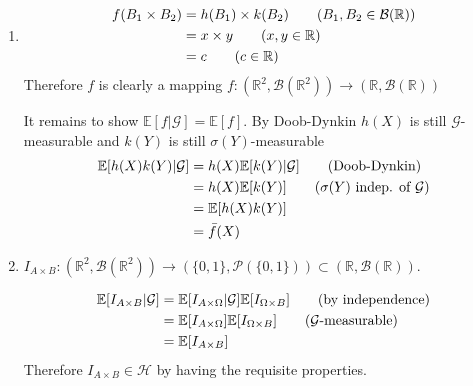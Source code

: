 \documentclass[12pt, letterpaper]{article}
\begin{document}
\begin{enumerate} [label = \textbf{\alph*)}]
\begin{enumerate} [label = \roman*)]
		Therefore $h \in \mathcal{H}$

		\item for $\alpha \in \mathbb{R}$: \newline
		$h = \alpha\cdot f(B_1 \times	B_2) = \alpha \times x \; \; \; $ where $\alpha, x \in \mathbb{R}$.  \newline Which is just a mapping $h :(\mathbb{R}^2, \mathcal{B}(\mathbb{R}^2)) \rightarrow (\mathbb{R}, \mathcal{B}(\mathbb{R}))$. 
		
		$\mathbb{E}[h|\mathcal{G}] = \mathbb{E}[\alpha \cdot f|\mathcal{G}] = \alpha \times \mathbb{E}[f|\mathcal{G}] = \alpha \mathbb{E}[f] = \mathbb{E}[\alpha \cdot f] =\mathbb{E}[h]$
		
		Therefore $h \in \mathcal{H}$
	\end{enumerate}
	
	We have shown $\mathcal{H}$ is a vector space.
	
	\item	 \begin{align*}
			f(B_1 \times B_2) & = h(B_1)\times k(B_2) \tag{$B_1, B_2 \in \mathcal{B}(\mathbb{R})$} \\
			& = x \times y \tag{$x, y \in \mathbb{R}$}\\
			& = c \tag{$c \in \mathbb{R}$}
		\end{align*}
		Therefore $f$ is clearly a mapping $f :(\mathbb{R}^2, \mathcal{B}(\mathbb{R}^2)) \rightarrow (\mathbb{R}, \mathcal{B}(\mathbb{R}))$
		
		It remains to show $\mathbb{E}[f|\mathcal{G}] = \mathbb{E}[f]$. By Doob-Dynkin $h(X)$ is still $\mathcal{G}$-measurable and $k(Y)$ is still $\sigma(Y)$-measurable
		\begin{align*}
			\mathbb{E}[h(X)k(Y)|\mathcal{G}] & =h(X) \mathbb{E}[k(Y)|\mathcal{G}] \tag{Doob-Dynkin}\\
			& = h(X) \mathbb{E}[k(Y)] \tag{$\sigma (Y)\textrm{ indep. of }\mathcal{G}$} \\
			& = \mathbb{E}[h(X)k(Y)] \\
			& = \bar{f}(X) 
		\end{align*}

	\item 
	$I_{A \times B} : (\mathbb{R}^2, \mathcal{B}(\mathbb{R}^2)) \rightarrow (\{0, 1\}, \mathcal{P}(\{0, 1\}))\subset (\mathbb{R}, \mathcal{B}(\mathbb{R}))$.
	
	\begin{align*}
		\mathbb{E}[I_{A\times B}|\mathcal{G}] & = \mathbb{E}[I_{A \times \Omega}|\mathcal{G}]\mathbb{E}[I_{\Omega \times B}] \tag{by independence}\\
		& = \mathbb{E}[I_{A \times \Omega}]\mathbb{E}[I_{\Omega \times B}] \tag{$\mathcal{G}$-measurable}\\
		& = \mathbb{E}[I_{A \times B}]
	\end{align*}
	Therefore $I_{A \times	B} \in \mathcal{H}$ by having the requisite properties. 
	

\end{enumerate}
\end{document}
